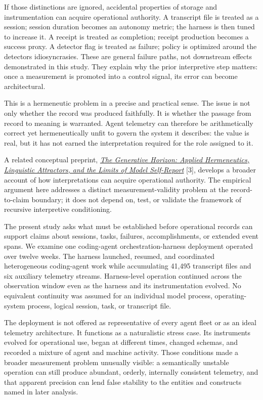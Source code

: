 \documentclass[12pt]{article}
\begin{document}
If those distinctions are ignored, accidental properties of storage and instrumentation can acquire operational authority. A transcript file is treated as a session; session duration becomes an autonomy metric; the harness is then tuned to increase it. A receipt is treated as completion; receipt production becomes a success proxy. A detector flag is treated as failure; policy is optimized around the detector\textquotesingle s idiosyncrasies. These are general failure paths, not downstream effects demonstrated in this study. They explain why the prior interpretive step matters: once a measurement is promoted into a control signal, its error can become architectural.

This is a hermeneutic problem in a precise and practical sense. The issue is not only whether the record was produced faithfully. It is whether the passage from record to meaning is warranted. Agent telemetry can therefore be arithmetically correct yet hermeneutically unfit to govern the system it describes: the value is real, but it has not earned the interpretation required for the role assigned to it.

A related conceptual preprint, \href{https://doi.org/10.5281/zenodo.21659634}{\emph{The Generative Horizon: Applied Hermeneutics, Linguistic Attractors, and the Limits of Model Self-Report}} {[}3{]}, develops a broader account of how interpretations can acquire operational authority. The empirical argument here addresses a distinct measurement-validity problem at the record-to-claim boundary; it does not depend on, test, or validate the framework of recursive interpretive conditioning.

The present study asks what must be established before operational records can support claims about sessions, tasks, failures, accomplishments, or extended event spans. We examine one coding-agent orchestration-harness deployment operated over twelve weeks. The harness launched, resumed, and coordinated heterogeneous coding-agent work while accumulating 41,495 transcript files and six auxiliary telemetry streams. Harness-level operation continued across the observation window even as the harness and its instrumentation evolved. No equivalent continuity was assumed for an individual model process, operating-system process, logical session, task, or transcript file.

The deployment is not offered as representative of every agent fleet or as an ideal telemetry architecture. It functions as a naturalistic stress case. Its instruments evolved for operational use, began at different times, changed schemas, and recorded a mixture of agent and machine activity. Those conditions made a broader measurement problem unusually visible: a semantically unstable operation can still produce abundant, orderly, internally consistent telemetry, and that apparent precision can lend false stability to the entities and constructs named in later analysis.
\end{document}
